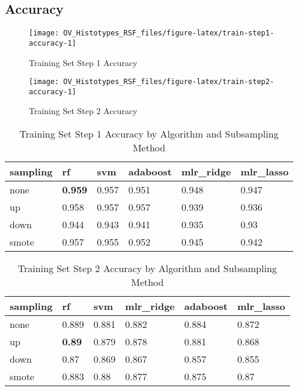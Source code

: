 \documentclass[
]{report}
\begin{document}
\hypertarget{accuracy-1}{%
\subsection{Accuracy}\label{accuracy-1}}

\begin{figure}[H]

{\centering \texttt{[image: OV\_Histotypes\_RSF\_files/figure-latex/train-step1-accuracy-1]} 

}

\caption{Training Set Step 1 Accuracy}\label{fig:train-step1-accuracy}
\end{figure}

\begin{figure}[H]

{\centering \texttt{[image: OV\_Histotypes\_RSF\_files/figure-latex/train-step2-accuracy-1]} 

}

\caption{Training Set Step 2 Accuracy}\label{fig:train-step2-accuracy}
\end{figure}

\begin{table}

\caption{\label{tab:train-step1-accuracy-table}Training Set Step 1 Accuracy by Algorithm and Subsampling Method}
\centering
\begin{tabular}[t]{l|l|l|l|l|l}
\hline
sampling & rf & svm & adaboost & mlr\_ridge & mlr\_lasso\\
\hline
none & \textbf{0.959} & 0.957 & 0.951 & 0.948 & 0.947\\
\hline
up & 0.958 & 0.957 & 0.957 & 0.939 & 0.936\\
\hline
down & 0.944 & 0.943 & 0.941 & 0.935 & 0.93\\
\hline
smote & 0.957 & 0.955 & 0.952 & 0.945 & 0.942\\
\hline
\end{tabular}
\end{table}

\begin{table}

\caption{\label{tab:train-step2-accuracy-table}Training Set Step 2 Accuracy by Algorithm and Subsampling Method}
\centering
\begin{tabular}[t]{l|l|l|l|l|l}
\hline
sampling & rf & svm & mlr\_ridge & adaboost & mlr\_lasso\\
\hline
none & 0.889 & 0.881 & 0.882 & 0.884 & 0.872\\
\hline
up & \textbf{0.89} & 0.879 & 0.878 & 0.881 & 0.868\\
\hline
down & 0.87 & 0.869 & 0.867 & 0.857 & 0.855\\
\hline
smote & 0.883 & 0.88 & 0.877 & 0.875 & 0.87\\
\hline
\end{tabular}
\end{table}
\end{document}
